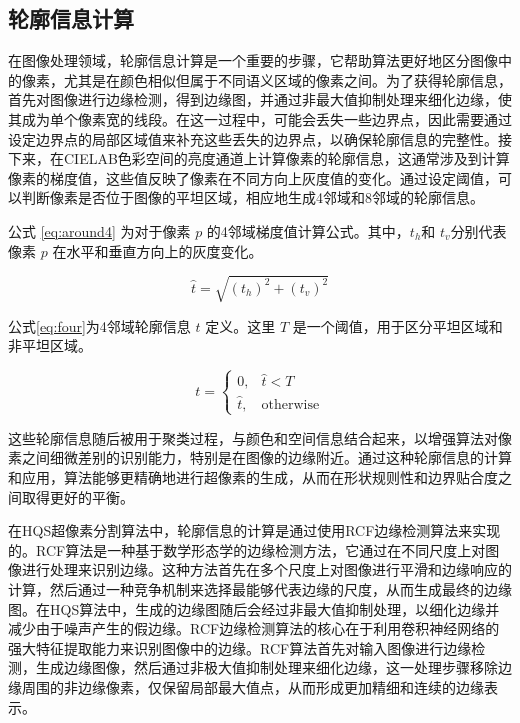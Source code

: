 \subsection{轮廓信息计算}
在图像处理领域，轮廓信息计算是一个重要的步骤，它帮助算法更好地区分图像中的像素，尤其是在颜色相似但属于不同语义区域的像素之间。为了获得轮廓信息，首先对图像进行边缘检测，得到边缘图，并通过非最大值抑制处理来细化边缘，使其成为单个像素宽的线段。在这一过程中，可能会丢失一些边界点，因此需要通过设定边界点的局部区域值来补充这些丢失的边界点，以确保轮廓信息的完整性。接下来，在CIELAB色彩空间的亮度通道上计算像素的轮廓信息，这通常涉及到计算像素的梯度值，这些值反映了像素在不同方向上灰度值的变化。通过设定阈值，可以判断像素是否位于图像的平坦区域，相应地生成4邻域和8邻域的轮廓信息。

公式 \eqref{eq:around4} 为对于像素 \(p\) 的4邻域梯度值计算公式。其中，\(t_h\)​ 和 \(t_v​\)​ 分别代表像素 \(p\) 在水平和垂直方向上的灰度变化。

\begin{equation}
  \hat{t} = \sqrt{(t_h)^2 + (t_v)^2}
  \label{eq:around4}
\end{equation}

公式\eqref{eq:four}为4邻域轮廓信息 \(t\) 定义。这里 \(T\) 是一个阈值，用于区分平坦区域和非平坦区域。

\begin{equation}
  t = \begin{cases}
    0, & \hat{t} < T \\
    \hat{t}, & \text{otherwise}
  \end{cases}
  \label{eq:four}
\end{equation}

这些轮廓信息随后被用于聚类过程，与颜色和空间信息结合起来，以增强算法对像素之间细微差别的识别能力，特别是在图像的边缘附近。通过这种轮廓信息的计算和应用，算法能够更精确地进行超像素的生成，从而在形状规则性和边界贴合度之间取得更好的平衡。

在HQS超像素分割算法中，轮廓信息的计算是通过使用RCF边缘检测算法来实现的。RCF算法是一种基于数学形态学的边缘检测方法，它通过在不同尺度上对图像进行处理来识别边缘。这种方法首先在多个尺度上对图像进行平滑和边缘响应的计算，然后通过一种竞争机制来选择最能够代表边缘的尺度，从而生成最终的边缘图。在HQS算法中，生成的边缘图随后会经过非最大值抑制处理，以细化边缘并减少由于噪声产生的假边缘。RCF边缘检测算法的核心在于利用卷积神经网络的强大特征提取能力来识别图像中的边缘。RCF算法首先对输入图像进行边缘检测，生成边缘图像，然后通过非极大值抑制处理来细化边缘，这一处理步骤移除边缘周围的非边缘像素，仅保留局部最大值点，从而形成更加精细和连续的边缘表示。


